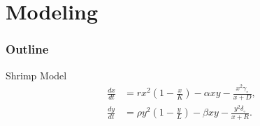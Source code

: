 
\section{Modeling}
\begin{frame}
  \frametitle{Outline}
  \tableofcontents[ currentsection ]
\end{frame}

\begin{frame}{Shrimp Model}
  \begin{align*}
    \frac{dx}{dt} & = rx^2 \left(1-\frac{x}{K}\right) - \alpha xy - \frac{x^2 \gamma_\circ}{x+D}, \\
    \frac{dy}{dt} & = \rho y^2 \left(1-\frac{y}{L}\right) - \beta xy -\frac{y^2 \delta_\circ}{x+R}.
  \end{align*}
\end{frame}